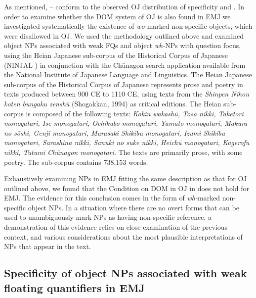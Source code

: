 \documentclass[output=paper]{LSP/langsci}
\begin{document}
As mentioned, -- conform to the observed OJ  
distribution of specificity and . In order to examine
whether the DOM system of OJ   is also found in EMJ we investigated
systematically the existence of \textit{wo-}marked non-specific
objects, which were disallowed in OJ. We used the methodology outlined
above and examined object NPs associated with weak FQs and object
\textit{wh-}NPs with question focus, using the Heian Japanese
sub-corpus of the Historical Corpus of Japanese (NINJAL \citeyear{NINJAL}) in
conjunction with the Chūnagon search application available from the
National Institute of Japanese Language and Linguistics. The Heian
Japanese sub-corpus of the Historical Corpus of Japanese represents
prose and poetry in texts produced between 900 CE to 1110 CE, using
texts from the \textit{Shinpen Nihon koten bungaku zenshū}
(Shogakkan, 1994) %
as critical editions. The Heian sub-corpus
is composed of the following texts: \textit{Kokin wakashū, Tosa
 nikki, Taketori monogatari, Ise monogatari, Ochikubo monogatari,
 Yamato monogatari, Makura no sōshi, Genji monogatari, Murasaki
 Shikibu monogatari, Izumi Shikibu monogatari, Sarashina nikki,
 Sanuki no suke nikki, Heichū monogatari, Kagerofu nikki, Tutumi
 Chūnagon monogatari.} The texts are primarily prose, with some
poetry. The sub-corpus contains 738,153 words.

Exhaustively examining NPs in EMJ fitting the same description as that
for OJ   outlined above, we found that the Condition on DOM in OJ   in
 does not hold for EMJ. The evidence for this conclusion
comes in the form of \textit{wh-}marked non-specific object NPs. In a
situation where there are no overt forms that can be used to
unambiguously mark NPs as having non-specific reference, a
demonstration of this evidence relies on close examination of the
previous context, and various considerations about the most plausible
interpretations of NPs that appear in the text.

\subsection{Specificity of object NPs associated with weak floating quantifiers in EMJ}
\label{07-fr-sec:3-1}
\end{document}
